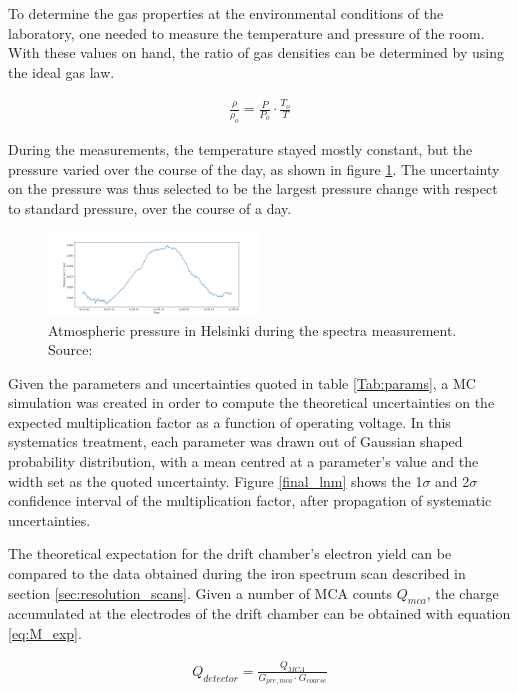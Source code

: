 To determine the gas properties at the environmental conditions of the laboratory, one needed to measure the temperature and pressure of the room. With these values on hand, the ratio of gas densities can be determined by using the ideal gas law.

\begin{align}
  \label{eq:gaslaw}
  \frac{\rho}{\rho_{o}} = \frac{P}{P_{o}}\cdot \frac{T_{o}}{T}
\end{align}

During the measurements, the temperature stayed mostly constant, but the pressure varied over the course of the day, as shown in figure \ref{fig:pressure}. The uncertainty on the pressure was thus selected to be the largest pressure change with respect to standard pressure, over the course of a day.

\begin{figure}[htb]
  \includegraphics[width=0.5\textwidth]{graphics/pressure_monitoring.png}
  \caption{Atmospheric pressure in Helsinki during the spectra measurement. Source: \cite{meteo}}
  \label{fig:pressure}
\end{figure}

Given the parameters and uncertainties quoted in table \ref{Tab:params}, a MC simulation was created in order to compute the theoretical uncertainties on the expected multiplication factor as a function of operating voltage. In this systematics treatment, each parameter was drawn out of Gaussian shaped probability distribution, with a mean centred at a parameter's value and the width set as the quoted uncertainty. Figure \ref{final_lnm} shows the 1$\sigma$ and 2$\sigma$ confidence interval of the multiplication factor, after propagation of systematic uncertainties.

The theoretical expectation for the drift chamber's electron yield can be compared to the data obtained during the iron spectrum scan described in section \ref{sec:resolution_scans}. Given a number of MCA counts $Q_{mca}$, the charge accumulated at the electrodes of the drift chamber can be obtained with equation \ref{eq:M_exp}.

\begin{align}
  \label{eq:M_exp}
  Q_{detector} = \frac{Q_{MCA}}{G_{pre,mca}\cdot{G_{coarse}}}
\end{align}

